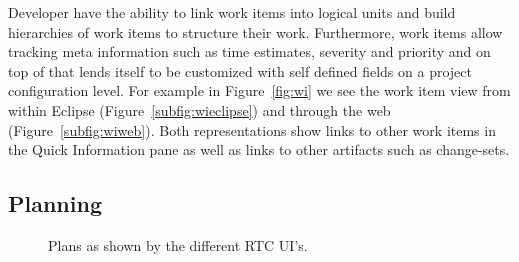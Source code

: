 Developer have the ability to link work items into logical units and build hierarchies of work items to structure their work.
Furthermore, work items allow tracking meta information such as time estimates, severity and priority and on top of that lends itself to be customized with self defined fields on a project configuration level.
For example in Figure~\ref{fig:wi} we see the work item view from within Eclipse (Figure~\ref{subfig:wieclipse}) and through the web (Figure~\ref{subfig:wiweb}).
Both representations show links to other work items in the Quick Information pane as well as links to other artifacts such as change-sets.

\subsection{Planning}
\begin{figure}[t]
\centering
{}
\caption{Plans as shown by the different RTC UI's.}
\label{fig:plan}
\end{figure}
